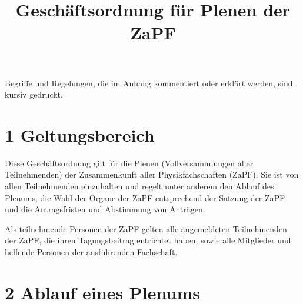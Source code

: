 \documentclass[12pt,oneside]{scrartcl}
\begin{document}
\title{Geschäftsordnung für Plenen der ZaPF%
  \label{geschaftsordnung-fur-plenen-der-zapf}}
\author{}
\date{}
\maketitle

Begriffe und Regelungen, die im Anhang kommentiert oder erklärt werden, sind
kursiv gedruckt.


\section{1 Geltungsbereich%
  \label{geltungsbereich}%
}

Diese Geschäftsordnung gilt für die Plenen (Vollversammlungen aller Teilnehmenden)
der Zusammenkunft aller Physikfachschaften (ZaPF).
Sie ist von allen Teilnehmenden einzuhalten und regelt unter
anderem den Ablauf des Plenums, die Wahl der Organe der ZaPF entsprechend der
Satzung der ZaPF und die Antragsfristen und Abstimmung von Anträgen.

Als teilnehmende Personen der ZaPF gelten alle angemeldeten Teilnehmenden
der ZaPF, die ihren Tagungsbeitrag entrichtet haben, sowie alle
Mitglieder und helfende Personen der ausführenden Fachschaft.


\section{2 Ablauf eines Plenums%
  \label{ablauf-eines-plenums}%
}
\end{document}

